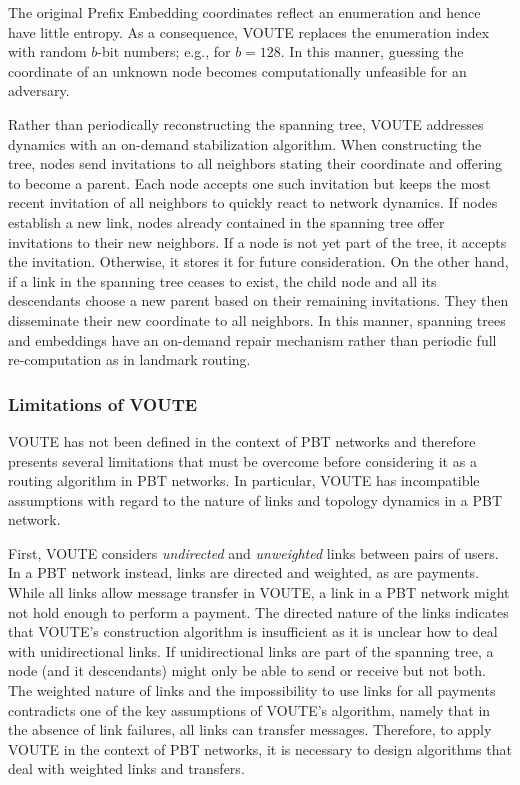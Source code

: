 The original Prefix Embedding coordinates reflect an enumeration and hence have little entropy. As a consequence, VOUTE replaces the enumeration index with random $b$-bit numbers; e.g., for $b=128$. In this manner, guessing the coordinate of an unknown node becomes computationally unfeasible for an adversary.    

Rather than periodically reconstructing the spanning tree, VOUTE addresses dynamics with an on-demand stabilization algorithm. 
When constructing the tree, nodes send invitations to all neighbors stating their coordinate and offering to become a parent. 
Each node accepts one such invitation but keeps the most recent invitation of all neighbors to quickly react to network dynamics. 
If nodes establish a new link, nodes already contained in the spanning tree offer invitations to their new neighbors. If a node is not yet part of the tree, it accepts the invitation. Otherwise, it stores it for future consideration.
On the other hand, if a link in the spanning tree ceases to exist, the child node and all its descendants choose a new parent based on their remaining invitations. They then disseminate their new coordinate to all neighbors.
In this manner, spanning trees and embeddings have an on-demand repair mechanism rather than periodic full re-computation as in landmark routing.  
 

\subsubsection{Limitations of VOUTE}
VOUTE has not been defined in the context of PBT networks and therefore 
presents several limitations that must be overcome before considering 
it as a routing algorithm in PBT networks.
In particular, VOUTE has incompatible assumptions with regard to the nature of links and topology dynamics in a PBT network.  

First, VOUTE considers \emph{undirected} and \emph{unweighted} links between pairs of users. In a PBT network instead, 
links are directed and weighted, as are payments. 
While all links allow message transfer in VOUTE, a link in a PBT network might not hold enough \money
to perform a payment. 
The directed nature of the links indicates that VOUTE's construction algorithm is insufficient as it is unclear how to deal
with unidirectional links. If unidirectional links are part of the spanning tree, a node (and it descendants) might only be able to send
or receive \money but not both. 
The weighted nature of links and the impossibility to use links for all payments contradicts one of the key assumptions of VOUTE's algorithm, namely that in the absence of link failures, all links can transfer messages. Therefore, to apply VOUTE in the context of PBT networks,
it is necessary to design algorithms that deal with weighted links and transfers. 

